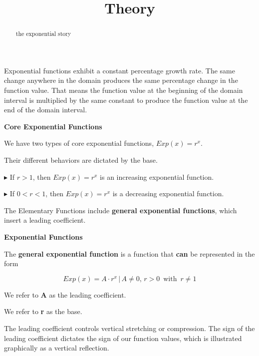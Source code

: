 \documentclass{ximera}
\title{Theory}
\begin{document}
\begin{abstract}
the exponential story
\end{abstract}
\maketitle



Exponential functions exhibit a constant percentage growth rate. The same change anywhere in the domain produces the same percentage change in the function value. That means the function value at the beginning of the domain interval is multiplied by the same constant to produce the function value at the end of the domain interval.

\textbf{Core Exponential Functions}

We have two types of core exponential functions, $Exp(x) = r^x$. 


Their different behaviors are dictated by the base.



$\blacktriangleright$ If $r > 1$, then $Exp(x) = r^x$ is an increasing exponential function.

$\blacktriangleright$ If $0 < r < 1$, then $Exp(x) = r^x$ is a decreasing exponential function.






The Elementary Functions include \textbf{general exponential functions}, which insert a leading coefficient.






\begin{definition} \textbf{\textcolor{green!50!black}{Exponential Functions}}

The \textbf{general exponential function} is a function that \textbf{\textcolor{purple!85!blue}{can}} be represented in the form 

\[  Exp(x) = A \cdot r^x    \, | \,  A \ne 0, \, r > 0 \, \text{ with } \, r \ne 1   \]


We refer to \textbf{\textcolor{purple!85!blue}{A}} as the leading coefficient.

We refer to \textbf{\textcolor{purple!85!blue}{r}} as the base.


\end{definition}





The leading coefficient controls vertical stretching or compression. The sign of the leading coefficient dictates the sign of our function values, which is illustrated graphically as a vertical reflection. 
\end{document}
